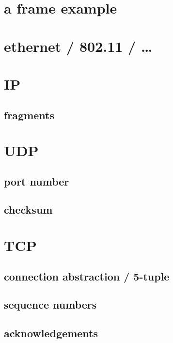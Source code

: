 \section{a frame example}



\section{ethernet / 802.11 / \ldots}



\section{IP}



\subsection{fragments}

\section{UDP}

\subsection{port number}

\subsection{checksum}

\section{TCP}

\subsection{connection abstraction / 5-tuple}

\subsection{sequence numbers}

\subsection{acknowledgements}

